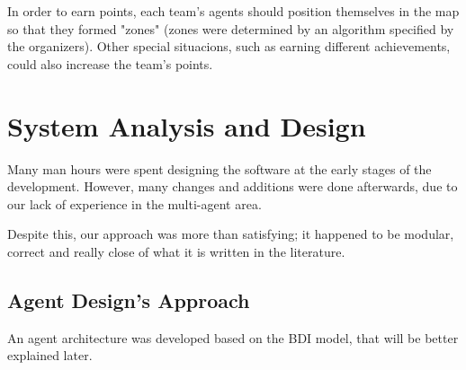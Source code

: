 \documentclass{llncs2e/llncs}
\begin{document}
    In order to earn points, each team's agents should position themselves in the 
    map so that they formed "zones" (zones were determined by an algorithm 
    specified by the organizers). Other special situacions, such as earning 
    different achievements, could also increase the team's points.

\section{System Analysis and Design}


    Many man hours were spent designing the software at the early stages of the 
    development. However, many changes and additions were done afterwards, due 
    to our lack of experience in the multi-agent area.
    
    Despite this, our approach was more than satisfying; it happened to be
    modular, correct and really close of what it is written in the literature. 

\subsection{Agent Design's Approach}

    An agent architecture was developed based on the BDI model, that will be
    better explained later.
\end{document}
